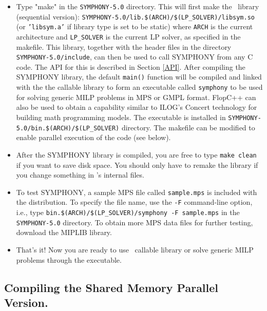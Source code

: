 \begin{itemize}

      \item Type "make" in the \texttt{SYMPHONY-5.0} directory. This will 
first make the \BB\ library (sequential version): 
\texttt{SYMPHONY-5.0/lib.\$(ARCH)/\$(LP\_SOLVER)/libsym.so} (or 
\texttt{'libsym.a'} if library type is set to be static) where 
\texttt{ARCH} is the current architecture and \texttt{LP\_SOLVER} is the 
current LP solver, as specified in the makefile. This library, together with
the header files in the directory \texttt{SYMPHONY-5.0/include}, can then be
used to call SYMPHONY from any C code. The API for this is described in
Section \ref{API}. After compiling the SYMPHONY library, the default
\texttt{main()} function will be compiled and linked with the the callable
library to form an executable called \texttt{symphony} to be used for solving
generic MILP problems in MPS or GMPL format. FlopC++ can also be used to
obtain a capability similar to ILOG's Concert technology for building math
programming models. The executable is installed in
\texttt{SYMPHONY-5.0/bin.\$(ARCH)/\$(LP\_SOLVER)} directory. The makefile 
can be modified to enable parallel execution of the code (see below).

\item After the SYMPHONY library is compiled, you are free to type {\tt make
        clean} if you want to save disk space. You should only have to
        remake the library if you change something in \BB's internal files. 

\item To test SYMPHONY, a sample MPS file called \texttt{sample.mps} is 
included with the distribution. To specify the file name, use the 
\texttt{-F} command-line option, i.e., 
type \texttt{bin.\$(ARCH)/\$(LP\_SOLVER)/symphony -F sample.mps} in the
\texttt{SYMPHONY-5.0} directory. To obtain more MPS data files for further
testing, download the MIPLIB library.

\item That's it! Now you are ready to use \BB\ callable library or 
solve generic MILP problems through the executable.

\end{itemize}

\subsection{Compiling the Shared Memory Parallel Version.}


